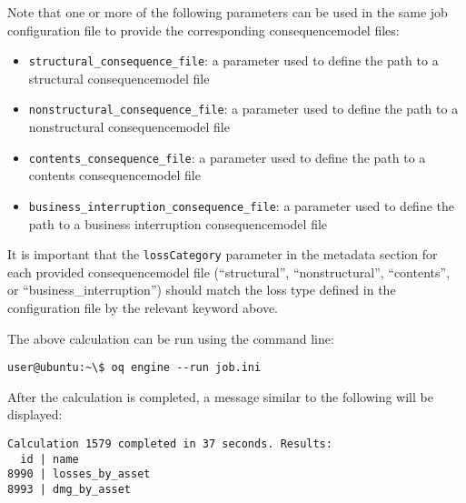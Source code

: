 Note that one or more of the following parameters can be used in the same job
configuration file to provide the corresponding \gls{consequencemodel} files:

\begin{itemize}

  \item \Verb+structural_consequence_file+: a parameter used to define the path
    to a structural \gls{consequencemodel} file

  \item \Verb+nonstructural_consequence_file+: a parameter used to define the path
    to a nonstructural \gls{consequencemodel} file

  \item \Verb+contents_consequence_file+: a parameter used to define the path
    to a contents \gls{consequencemodel} file

  \item \Verb+business_interruption_consequence_file+: a parameter used to define
    the path to a business interruption \gls{consequencemodel} file

\end{itemize}

It is important that the \Verb+lossCategory+ parameter in the metadata section
for each provided \gls{consequencemodel} file (``structural'', ``nonstructural'',
``contents'', or ``business\_interruption'') should match the loss type
defined in the configuration file by the relevant keyword above.

The above calculation can be run using the command line:

\begin{verbatim}
user@ubuntu:~\$ oq engine --run job.ini
\end{verbatim}

After the calculation is completed, a message similar to the following will be
displayed:

\begin{verbatim}
Calculation 1579 completed in 37 seconds. Results:
  id | name
8990 | losses_by_asset
8993 | dmg_by_asset
\end{verbatim}
